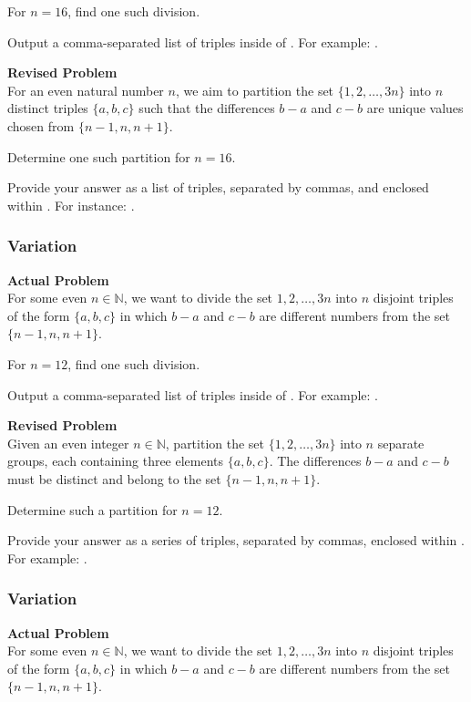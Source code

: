 For $n = 16$, find one such division.

Output a comma-separated list of triples inside of \boxed. For example: .

\textbf{Revised Problem}\\
For an even natural number \( n \), we aim to partition the set \(\{1, 2, \ldots, 3n\}\) into \( n \) distinct triples \(\{a, b, c\}\) such that the differences \( b-a \) and \( c-b \) are unique values chosen from \(\{n-1, n, n+1\}\).

Determine one such partition for \( n = 16 \).

Provide your answer as a list of triples, separated by commas, and enclosed within \boxed. For instance: .

\subsubsection{Variation}
\textbf{Actual Problem}\\
For some even $n \in \mathbb{N}$, we want to divide the set ${1, 2, \ldots, 3n}$ into $n$ disjoint triples of the form $\{a,b,c\}$ in which $b-a$ and $c-b$ are different numbers from the set $\{n-1,n,n+1\}$.

For $n = 12$, find one such division.

Output a comma-separated list of triples inside of \boxed. For example: .

\textbf{Revised Problem}\\
Given an even integer $n \in \mathbb{N}$, partition the set $\{1, 2, \ldots, 3n\}$ into $n$ separate groups, each containing three elements $\{a, b, c\}$. The differences $b-a$ and $c-b$ must be distinct and belong to the set $\{n-1, n, n+1\}$.

Determine such a partition for $n = 12$.

Provide your answer as a series of triples, separated by commas, enclosed within \boxed. For example: .

\subsubsection{Variation}
\textbf{Actual Problem}\\
For some even $n \in \mathbb{N}$, we want to divide the set ${1, 2, \ldots, 3n}$ into $n$ disjoint triples of the form $\{a,b,c\}$ in which $b-a$ and $c-b$ are different numbers from the set $\{n-1,n,n+1\}$.

